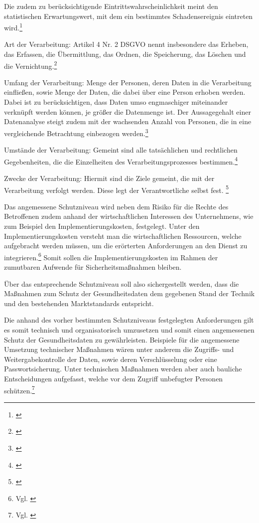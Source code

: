 \glqq Die zudem zu berücksichtigende Eintrittswahrscheinlichkeit meint den statistischen Erwartungswert, mit dem ein bestimmtes Schadensereignis eintreten wird.\grqq{}\footnote{\cite[S. 41]{Bundesaerztekammer2019}}

\glqq Art der Verarbeitung: Artikel 4 Nr. 2 DSGVO nennt insbesondere das Erheben, das Erfassen, die Übermittlung, das Ordnen, die Speicherung, das Löschen und die Vernichtung.\grqq{}\footnote{\cite[S. 41]{Bundesaerztekammer2019}}

\glqq Umfang der Verarbeitung: Menge der Personen, deren Daten in die Verarbeitung einfließen, sowie Menge der Daten, die dabei über eine Person erhoben werden. Dabei ist zu berücksichtigen, dass Daten umso engmaschiger miteinander verknüpft werden können, je größer die Datenmenge ist. Der Aussagegehalt einer Datenanalyse steigt zudem mit der wachsenden Anzahl von Personen, die in eine vergleichende Betrachtung einbezogen werden.\grqq{}\footnote{\cite[S. 41]{Bundesaerztekammer2019}}

\glqq Umstände der Verarbeitung: Gemeint sind alle tatsächlichen und rechtlichen Gegebenheiten, die die Einzelheiten des Verarbeitungsprozesses bestimmen.\grqq{}\footnote{\cite[S. 42]{Bundesaerztekammer2019}}

\glqq Zwecke der Verarbeitung: Hiermit sind die Ziele gemeint, die mit der Verarbeitung verfolgt werden. Diese legt der Verantwortliche selbst fest.\grqq{}
\footnote{\cite[S. 42]{Bundesaerztekammer2019}}

Das angemessene Schutzniveau wird neben dem Risiko für die Rechte des Betroffenen zudem anhand der wirtschaftlichen Interessen des Unternehmens, wie zum Beispiel den Implementierungskosten, festgelegt. Unter den Implementierungskosten versteht man die wirtschaftlichen Ressourcen, welche aufgebracht werden müssen, um die erörterten Anforderungen an den Dienst zu integrieren.\footnote{Vgl. \cite[S. 42 f.]{Bundesaerztekammer2019}} Somit sollen die Implementierungskosten im Rahmen der zumutbaren Aufwende für Sicherheitsmaßnahmen bleiben. 

Über das entsprechende Schutzniveau soll also sichergestellt werden, dass die Maßnahmen zum Schutz der Gesundheitsdaten dem gegebenen Stand der Technik und den bestehenden Marktstandards entspricht. 

Die anhand des vorher bestimmten Schutzniveaus festgelegten Anforderungen gilt es somit technisch und organisatorisch umzusetzen und somit einen angemessenen Schutz der Gesundheitsdaten zu gewährleisten. Beispiele für die angemessene Umsetzung technischer Maßnahmen wären unter anderem die Zugriffs- und Weitergabekontrolle der Daten, sowie deren Verschlüsselung oder eine Passwortsicherung. Unter technischen Maßnahmen werden aber auch bauliche Entscheidungen aufgefasst, welche vor dem Zugriff unbefugter Personen schützen.\footnote{Vgl. \cite[S. 41 ff.]{Bundesaerztekammer2019}}

